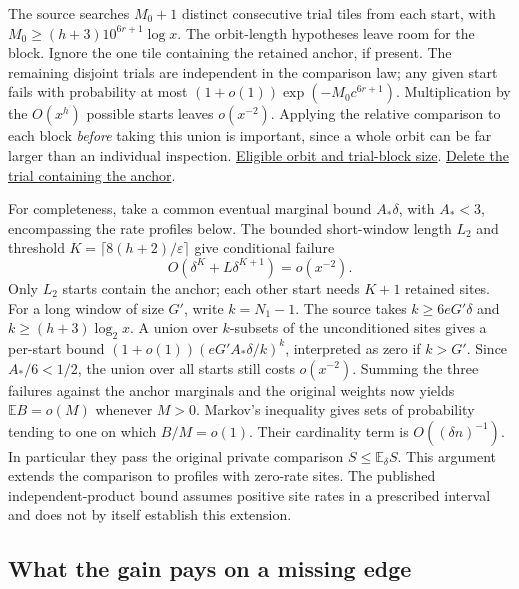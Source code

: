 \documentclass[12pt,letterpaper]{article}
\begin{document}
The source searches \(M_0+1\) distinct consecutive trial tiles from each start, with \(M_0\ge(h+3)10^{6r+1}\log x\). The orbit-length hypotheses leave room for the block. Ignore the one tile containing the retained anchor, if present. The remaining disjoint trials are independent in the comparison law; any given start fails with probability at most \((1+o(1))\exp(-M_0 c^{6r+1})\). Multiplication by the \(O(x^h)\) possible starts leaves \(o(x^{-2})\). Applying the relative comparison to each block \emph{before} taking this union is important, since a whole orbit can be far larger than an individual inspection.
\href{https://github.com/nousentllc/riemann-hypothesis/blob/40e56bab026552e089d7afcfeff08d2defb9c005/src/Development/AutomorphicArithmetic/ThickFrames/orbitTerms.lean#L107-L136}{Eligible orbit and trial-block size}.
\href{https://github.com/nousentllc/riemann-hypothesis/blob/40e56bab026552e089d7afcfeff08d2defb9c005/src/Development/AutomorphicArithmetic/ThickFrames/TilesLe.lean#L43-L67}{Delete the trial containing the anchor}.

For completeness, take a common eventual marginal bound \(A_*\delta\), with \(A_*<3\), encompassing the rate profiles below. The bounded short-window length \(L_2\) and threshold \(K=\lceil8(h+2)/\varepsilon\rceil\) give conditional failure
\[
 O\!\left(\delta^K+L\delta^{K+1}\right)=o(x^{-2}).
\]
Only \(L_2\) starts contain the anchor; each other start needs \(K+1\) retained sites. For a long window of size \(G'\), write \(k=N_1-1\). The source takes \(k\ge6eG'\delta\) and \(k\ge(h+3)\log_2x\). A union over \(k\)-subsets of the unconditioned sites gives a per-start bound \((1+o(1))(eG'A_*\delta/k)^k\), interpreted as zero if \(k>G'\). Since \(A_*/6<1/2\), the union over all starts still costs \(o(x^{-2})\). Summing the three failures against the anchor marginals and the original weights now yields \(\mathbb E B=o(M)\) whenever \(M>0\). Markov's inequality gives sets of probability tending to one on which \(B/M=o(1)\). Their cardinality term is \(O((\delta n)^{-1})\). In particular they pass the original private comparison \(S\le\mathbb E_\delta S\). This argument extends the comparison to profiles with zero-rate sites. The published independent-product bound assumes positive site rates in a prescribed interval and does not by itself establish this extension.

\subsection{What the gain pays on a missing edge}
\end{document}
